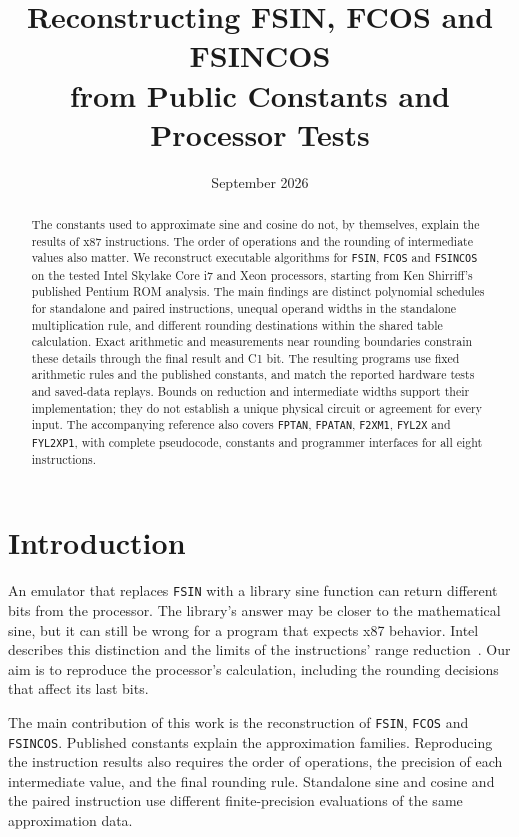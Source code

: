 \documentclass[11pt]{article}
\title{Reconstructing FSIN, FCOS and FSINCOS\\
from Public Constants and Processor Tests}
\author{}
\date{September 2026}
\newcommand{\ins}[1]{\texttt{#1}}
\begin{document}
\maketitle
\begin{abstract}
The constants used to approximate sine and cosine do not, by themselves,
explain the results of x87 instructions. The order of operations and the
rounding of intermediate values also matter. We reconstruct executable
algorithms for \ins{FSIN}, \ins{FCOS} and \ins{FSINCOS} on the tested Intel
Skylake Core i7 and Xeon processors, starting from Ken Shirriff's published
Pentium ROM analysis. The main findings are distinct polynomial schedules
for standalone and paired instructions, unequal operand widths in the
standalone multiplication rule, and different rounding destinations within
the shared table calculation. Exact arithmetic and measurements near rounding boundaries constrain these
details through the final result and C1 bit. The resulting programs use fixed arithmetic rules and the published
constants, and match the reported hardware tests and saved-data replays.
Bounds on reduction and intermediate widths support their implementation;
they do not establish a unique physical circuit or agreement for every input.
The accompanying reference also covers \ins{FPTAN}, \ins{FPATAN},
\ins{F2XM1}, \ins{FYL2X} and \ins{FYL2XP1}, with complete pseudocode,
constants and programmer interfaces for all eight instructions.
\end{abstract}

\section{Introduction}

An emulator that replaces \ins{FSIN} with a library sine function can return
different bits from the processor. The library's answer may be closer to the
mathematical sine, but it can still be wrong for a program that expects x87
behavior. Intel describes this distinction and the limits of the instructions'
range reduction~\cite{intelDifference}. Our aim is to reproduce the processor's
calculation, including the rounding decisions that affect its last bits.

The main contribution of this work is the reconstruction of \ins{FSIN},
\ins{FCOS} and \ins{FSINCOS}. Published constants explain the approximation
families. Reproducing the instruction results also requires the order of
operations, the precision of each intermediate value, and the final rounding
rule. Standalone sine and cosine and the paired instruction use different
finite-precision evaluations of the same approximation data.
\end{document}
